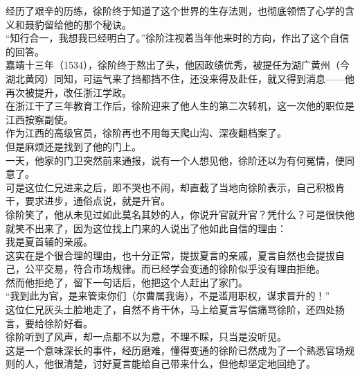 \begin{multicols}{\theparacolNo}
经历了艰辛的历练，徐阶终于知道了这个世界的生存法则，也彻底领悟了心学的含义和聂豹留给他的那个秘诀。\\

“知行合一，我想我已经明白了。”徐阶注视着当年他来时的方向，作出了这个自信的回答。\\

嘉靖十三年（1534），徐阶终于熬出了头，他因政绩优秀，被提任为湖广黄州（今湖北黄冈）同知，可运气来了挡都挡不住，还没来得及赴任，就又得到消息——他再次被提升，改任浙江学政。\\

在浙江干了三年教育工作后，徐阶迎来了他人生的第二次转机，这一次他的职位是江西按察副使。\\

作为江西的高级官员，徐阶再也不用每天爬山沟、深夜翻档案了。\\

但是麻烦还是找到了他的门上。\\

一天，他家的门卫突然前来通报，说有一个人想见他，徐阶还以为有何冤情，便同意了。\\

可是这位仁兄进来之后，即不哭也不闹，却直截了当地向徐阶表示，自己积极肯干，要求进步，通俗点说，就是升官。\\

徐阶笑了，他从未见过如此莫名其妙的人，你说升官就升官？凭什么？可是很快他就笑不出来了，因为这位找上门来的人说出了他如此自信的理由：\\

我是夏首辅的亲戚。\\

这实在是个很合理的理由，也十分正常，提拔夏言的亲戚，夏言自然也会提拔自己，公平交易，符合市场规律。而已经学会变通的徐阶似乎没有理由拒绝。\\

然而他拒绝了，留下一句话后，他把这个人赶出了家门。\\

“我到此为官，是来管束你们（尔曹属我诲），不是滥用职权，谋求晋升的！”\\

这位仁兄灰头土脸地走了，自然不肯干休，马上给夏言写信痛骂徐阶，还四处扬言，要给徐阶好看。\\

徐阶听到了风声，却一点都不以为意，不理不睬，只当是没听见。\\

这是一个意味深长的事件，经历磨难，懂得变通的徐阶已然成为了一个熟悉官场规则的人，他很清楚，讨好夏言能给自己带来什么，但他却坚定地回绝了。\\


\end{multicols}
